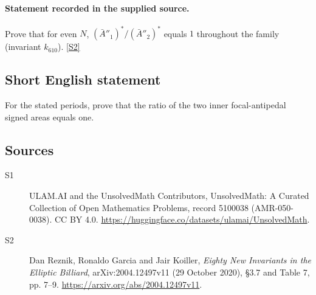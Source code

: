 \documentclass[11pt]{article}
\newcommand{\sref}[2]{\hyperlink{source:#1:#2}{[S#2]}}
\begin{document}
\paragraph{Statement recorded in the supplied source.}
Prove that for even $N$, $(\bar A''_1)^*/(\bar A''_2)^*$ equals $1$ throughout the family (invariant $k_{610}$). \sref{5100038}{2}
\subsection{Short English statement}
For the stated periods, prove that the ratio of the two inner focal-antipedal signed areas equals one.
\subsection{Sources}
\begin{description}
\item[\hypertarget{source:5100038:1}{S1}] ULAM.AI and the UnsolvedMath Contributors, UnsolvedMath: A Curated Collection of Open Mathematics Problems, record 5100038 (AMR-050-0038). CC BY 4.0. \url{https://huggingface.co/datasets/ulamai/UnsolvedMath}.
\item[\hypertarget{source:5100038:2}{S2}] Dan Reznik, Ronaldo Garcia and Jair Koiller, \emph{Eighty New Invariants in the Elliptic Billiard}, arXiv:2004.12497v11 (29 October 2020), \S3.7 and Table 7, pp. 7--9. \url{https://arxiv.org/abs/2004.12497v11}.
\end{description}
\label{end:5100038}
\end{document}
